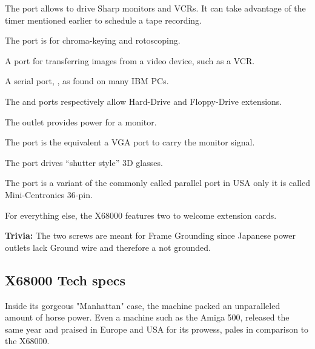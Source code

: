 The  port allows to drive Sharp monitors and VCRs. It can take advantage of the timer mentioned earlier to schedule a tape recording.

The  port is for chroma-keying and rotoscoping.

A  port for transferring images from a video device, such as a VCR.

A serial port, , as found on many IBM PCs.



The  and  ports respectively allow Hard-Drive and Floppy-Drive extensions.

The  outlet provides power for a monitor.

The  port is the equivalent a VGA port to carry the monitor signal.


The  port drives “shutter style” 3D glasses.

The  port is a variant of the commonly called parallel port in USA only it is called Mini-Centronics 36-pin. 

For everything else, the X68000 features two  to welcome extension cards.

\textbf{Trivia:} The two  screws are meant for Frame Grounding since Japanese power outlets lack Ground wire and therefore a not grounded.


\pagebreak



\subsection{X68000 Tech specs}  
Inside its gorgeous "Manhattan" case, the machine packed an unparalleled amount of horse power. Even a machine such as the Amiga 500, released the same year and praised in Europe and USA for its prowess, pales in comparison to the X68000. 


